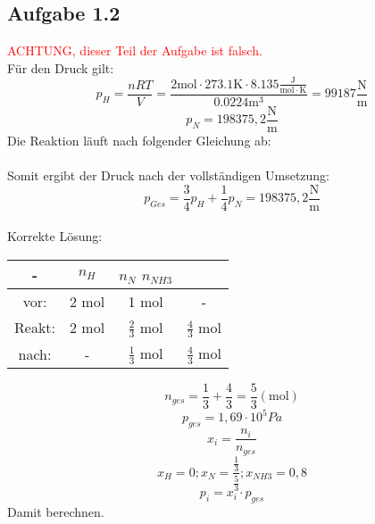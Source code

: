\documentclass{article}
\begin{document}
\subsection*{Aufgabe 1.2}
\textcolor{red}{ACHTUNG, dieser Teil der Aufgabe ist falsch.}\\
Für den Druck gilt:
\begin{equation*}
    p_H=\frac{nRT}{V}=\frac{ 2 \mathrm{mol}\cdot 273.1 \mathrm{K} \cdot 8.135 \mathrm{\frac{J}{mol\cdot K}}}{ 0.0224 \mathrm{m^3}} = 99187 \mathrm{\frac{N}{m}}
\end{equation*}
\begin{equation*}
    p_N= 198375,2 \mathrm{\frac{N}{m}}
\end{equation*}
Die Reaktion läuft nach folgender Gleichung ab:\\
\\
Somit ergibt der Druck nach der vollständigen Umsetzung:
\begin{equation*}
    p_{Ges}=\frac{3}{4}p_H + \frac{1}{4}p_N = 198375,2 \frac{\mathrm{N}}{\mathrm{m}}
\end{equation*}
\\
Korrekte Lösung:
\begin{center}
    \begin{tabular}{c c c c}
        \hline
        - & $n_H$ & $n_N$ $n_{NH3}$\\
        \hline
        vor: & 2 mol & 1 mol & -\\
        Reakt: & 2 mol & $\frac{2}{3}$ mol & $\frac{4}{3}$ mol\\
        nach: & - & $\frac{1}{3}$ mol & $\frac{4}{3}$ mol\\ 
        \hline
    \end{tabular}
\end{center}
\begin{equation*}
    n_{ges}=\frac{1}{3} + \frac{4}{3} = \frac{5}{3} ( \mathrm{mol})
\end{equation*}
\begin{equation*}
    p_{ges} = 1,69 \cdot 10^5 Pa
\end{equation*}
\begin{equation*}
    x_i = \frac{n_i}{n_{ges}}
\end{equation*}
\begin{equation*}
    x_H = 0; x_N = \frac{\frac{1}{3}}{\frac{5}{3}}; x_{NH3}=0,8
\end{equation*}
\begin{equation*}
    p_i = x_i \cdot p_{ges}
\end{equation*}
Damit berechnen.
\end{document}
